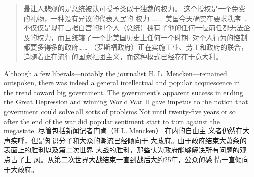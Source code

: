 \begin{paracol}{2}
\begin{quotation}
最让人悲观的是总统被认可授予类似于独裁的权力。
这个授权是一个免费的礼物，一种没有异议的代表人民的
权力 ...... 美国今天确实在要求秩序 … 不仅仅是现在占据白宫的那个人（总统）拥有了他的任何一位前任都无法企及的权力，而且统辖了一个比美国历史上任何一个时期$\cdot$ 对个人行为的控制都要多得多的政府…… （罗斯福政府）正在实施工业、劳工和政府的联合，追随着正在流行的国家社团主义，而这种模式已经存在于意大利。
\end{quotation}
\switchcolumn*
Although a few liberals---notably the journalist H. L. Mencken---remained outspoken, there was indeed a general intellectual and popular acquiescence in the trend toward big government. The government's apparent success in ending the Great Depression and winning World War II gave impetus to the notion that government could solve all sorts of problems.Not until twenty-five years or so after the end of the war did
popular sentiment start to turn against the megastate.
\switchcolumn
尽管包括新闻记者门肯（H.L. Mencken） 在内的自由主
义者仍然在大声疾呼，但是知识分子和大众的潮流已经倾向于
大政府。由于政府结束大萧条的表面上的胜利以及第二次世界
大战的胜利，那些认为政府能够解决所有问题的观点占了上
风。从第二次世界大战结束一直到战后大约25年，公众的感
情一直倾向于大政府。


\end{paracol}
